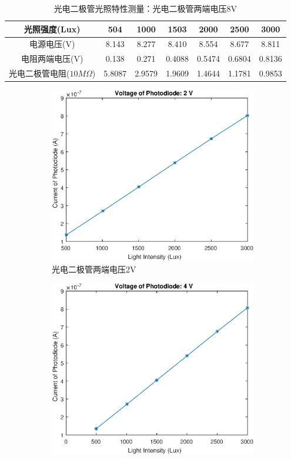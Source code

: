 \documentclass{ctexart}
\begin{document}
\begin{table}[H]
  \centering
  \begin{tabular}{|c|c|c|c|c|c|c|}
    \hline
    光照强度(Lux) &504&1000&1503&2000&2500&3000\\\hline
    电源电压(V) &8.143&8.277&8.410&8.554&8.677&8.811\\\hline
    电阻两端电压(V) &0.138&0.271&0.4088&0.5474&0.6804&0.8136\\\hline
    光电二极管电阻($10M\Omega$) & 5.8087&2.9579&1.9609&1.4644&1.1781&0.9853\\\hline
  \end{tabular}
  \caption{光电二极管光照特性测量：光电二极管两端电压8V}
\end{table}

\begin{figure}[H]
  \centering
  \begin{subfigure}{.45\textwidth}
    \centering
    \includegraphics[width=\linewidth]{光电传感器综合实验图像/photodiode_2V}
    \caption{光电二极管两端电压2V}
  \end{subfigure}
  \begin{subfigure}{.45\textwidth}
    \centering
    \includegraphics[width=\linewidth]{光电传感器综合实验图像/photodiode_4V}

\end{subfigure}
\end{figure}
\end{document}
